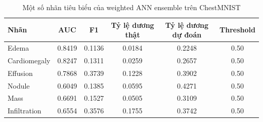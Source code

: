 \begin{table}[H]
\centering
\caption{Một số nhãn tiêu biểu của weighted ANN ensemble trên ChestMNIST}
\label{tab:chestmnist-weighted-per-class}
\begin{tabular}{l c c c c c}
\toprule
Nhãn & AUC & F1 & Tỷ lệ dương thật & Tỷ lệ dương dự đoán & Threshold \\
\midrule
Edema & 0.8419 & 0.1136 & 0.0184 & 0.2248 & 0.50 \\
Cardiomegaly & 0.8247 & 0.1311 & 0.0259 & 0.2657 & 0.50 \\
Effusion & 0.7868 & 0.3739 & 0.1228 & 0.3902 & 0.50 \\
Nodule & 0.6049 & 0.1385 & 0.0595 & 0.4271 & 0.50 \\
Mass & 0.6691 & 0.1527 & 0.0505 & 0.3109 & 0.50 \\
Infiltration & 0.6554 & 0.3576 & 0.1755 & 0.3742 & 0.50 \\
\bottomrule
\end{tabular}
\end{table}
